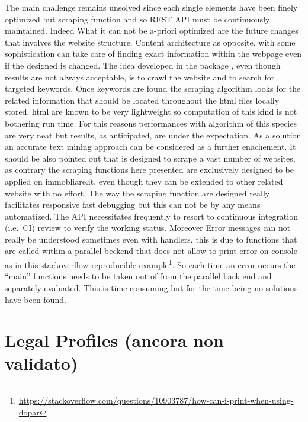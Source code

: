 \documentclass[
  12pt,
  a4paper,
  oneside]{book}
\DeclareRobustCommand{\href}[2]{#2\footnote{\url{#1}}}
\begin{document}
The main challenge remains unsolved since each single elements have been finely optimized but scraping function and so REST API must be continuously maintained. Indeed What it can not be a-priori optimized are the future changes that involves the website structure. Content architecture as opposite, with some sophistication can take care of finding exact information within the webpage even if the designed is changed. The idea developed in the package \citet{Rcrawler}, even though results are not always acceptable, is to crawl the website and to search for targeted keywords. Once keywords are found the scraping algorithm looks for the related information that should be located throughout the html files locally stored. html are known to be very lightweight so computation of this kind is not bothering run time. For this reasons performances with algorithm of this species are very neat but results, as anticipated, are under the expectation. As a solution an accurate text mining approach can be considered as a further enachement. It should be also pointed out that \citet{Rcrawler} is designed to scrape a vast number of websites, as contrary the scraping functions here presented are exclusively designed to be applied on immobliare.it, even though they can be extended to other related website with no effort.
The way the scraping function are designed really facilitates responsive fast debugging but this can not be by any means automatized. The API necessitates frequently to resort to continuous integration (i.e.~CI) review to verify the working status. Moreover Error messages can not really be understood sometimes even with handlers, this is due to functions that are called within a parallel beckend that does not allow to print error on console as in this \href{https://stackoverflow.com/questions/10903787/how-can-i-print-when-using-dopar}{stackoverflow reproducible example}. So each time an error occurs the ``main'' functions needs to be taken out of from the parallel back end and separately evaluated. This is time consuming but for the time being no solutions have been found.

\hypertarget{legal-profiles-ancora-non-validato}{%
\section{Legal Profiles (ancora non validato)}\label{legal-profiles-ancora-non-validato}}
\end{document}
